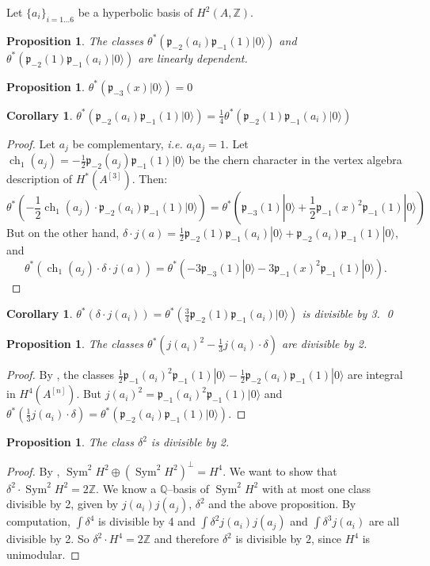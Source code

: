 \documentclass{amsart}
\DeclareMathOperator{\Sym}{Sym}
\DeclareMathOperator{\ch}{ch}
\newcommand{\hilb}[1]{^{[#1]}}
\newcommand{\ie}{{\it i.e. }}
\newcommand{\vac}{|0\rangle}
\newcommand{\p}{\mathfrak{p}}
\newcommand{\pone}{ \mathfrak{p}_{ - 1} }
\newcommand{\Q}{\mathbb{Q}}
\newcommand{\Z}{\mathbb{Z}}
\theoremstyle{plain}
\newtheorem{proposition}[theorem]{Proposition}
\newtheorem{corollary}[theorem]{Corollary}
\theoremstyle{definition}
\theoremstyle{remark}
\begin{document}
Let $\{a_i\}_{i= 1 \ldots 6}$ be a hyperbolic basis of 
$H^2(A,\Z)$.
\begin{proposition}
The classes $\theta^* \left(\p_{-2}(a_i)\pone(1)\vac\right) $ and $\theta^*\left( \p_{-2}(1)\pone(a_i)\vac\right) $ are linearly dependent.
\end{proposition}
\begin{proposition}
$\theta^*\left(\p_{-3}(x)\vac\right) =0$ 
\end{proposition}
\begin{corollary}
$\theta^* \left(\p_{-2}(a_i)\pone(1)\vac\right) = \frac{1}{4}\theta^*\left( \p_{-2}(1)\pone(a_i)\vac\right) $
\end{corollary}
\begin{proof}
Let $a_j$ be complementary, \ie $a_ia_j=1$. Let $\ch_1(a_j) = -\frac{1}{2} \p_{-2}(a_j)\pone(1)\vac$ be the chern character in the vertex algebra description of $H^*(A\hilb{3})$. Then:
$$
\theta^*\left(-\frac{1}{2}\ch_1(a_j)\cdot\p_{-2}(a_i)\pone(1)\vac \right) =
\theta^*\left(\p_{-3}(1)\vac + \frac{1}{2}\pone(x)^2\pone(1)\vac \right)
$$
But on the other hand, $\delta \cdot j(a) = \frac{1}{2} \p_{-2}(1)\pone(a_i)\vac+\p_{-2}(a_i)\pone(1)\vac$, and
$$
\theta^*\left(\ch_1(a_j)\cdot \delta \cdot j(a)\right) =
\theta^*\left(-3\p_{-3}(1)\vac  - 3\pone(x)^2\pone(1)\vac \right).
$$
\end{proof}
\begin{corollary}
$\theta^*\left( \delta \cdot j(a_i) \right) = \theta^*\left( \frac{3}{4} \p_{-2}(1)\pone(a_i)\vac\right)$ is divisible by 3. \qed
\end{corollary}
\begin{proposition}
The classes $\theta^*\left(j(a_i)^2 - \frac{1}{3}j(a_i)\cdot \delta\right)$ are divisible by 2.
\end{proposition}
\begin{proof}
By \cite{QinWang}, the classes $\frac{1}{2} \pone(a_i)^2\pone(1)\vac - \frac{1}{2}\p_{-2}(a_i)\pone(1)\vac$ are integral in $H^4(A\hilb{n})$. But $j(a_i)^2= \pone(a_i)^2\pone(1)\vac $ and $\theta^*\left(\frac{1}{3}j(a_i)\cdot\delta\right) =\theta^*\left(\p_{-2}(a_i)\pone(1)\vac\right)$.
\end{proof}
\begin{proposition}
The class $\delta^2$ is divisible by 2.
\end{proposition}
\begin{proof}
By \cite[Prop.~4.1]{HassettTschinkel}, $\Sym^2H^2 \oplus \left(\Sym^2H^2\right)^\perp = H^4$. 
We want to show that $\delta^2\cdot \Sym^2H^2 = 2\Z$. We know a $\Q$--basis of $\Sym^2H^2$ with at most one class divisible by 2, given by $j(a_i)j(a_j)$, $\delta^2$ and the above proposition. By computation, $\int \delta^4$ is divisible by 4 and $\int \delta^2 j(a_i)j(a_j)$ and $\int \delta^3 j(a_i)$ are all divisible by 2.
So $\delta^2\cdot H^4 = 2\Z$ and therefore $\delta^2$ is divisible by $2$, since $ H^4 $ is unimodular.
\end{proof}
\end{document}
